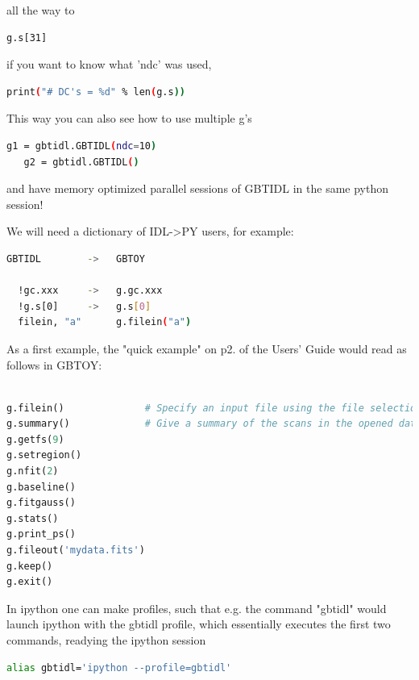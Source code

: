 \documentclass[12pt,a4paper]{article}
\begin{document}
all the way to

\begin{lstlisting}[language=bash]
   g.s[31]
\end{lstlisting}

if you want to know what 'ndc' was used,

\begin{lstlisting}[language=bash]
   print("# DC's = %d" % len(g.s))
\end{lstlisting}

This way you can also see how to use multiple g's

\begin{lstlisting}[language=bash]
   g1 = gbtidl.GBTIDL(ndc=10)
   g2 = gbtidl.GBTIDL()
\end{lstlisting}

and have memory optimized parallel sessions of GBTIDL in the same
python session!

We will need a dictionary of IDL->PY users, for example:

\begin{lstlisting}[language=bash]
GBTIDL        ->   GBTOY

  !gc.xxx     ->   g.gc.xxx
  !g.s[0]     ->   g.s[0]
  filein, "a"      g.filein("a")
\end{lstlisting}

As a first example, the "quick example" on p2. of the Users' Guide would
read as follows in GBTOY:

\begin{lstlisting}[language=python]
% gbtidl                # start up an ipython session with the gbtidl profile

g.filein()              # Specify an input file using the file selection GUI
g.summary()             # Give a summary of the scans in the opened data file
g.getfs(9)
g.setregion()
g.nfit(2)
g.baseline()
g.fitgauss()
g.stats()
g.print_ps()
g.fileout('mydata.fits')
g.keep()
g.exit()

\end{lstlisting}


In ipython one can make profiles, such that e.g. the command "gbtidl" would launch ipython with
the gbtidl profile, which essentially executes the first two commands, readying the ipython
session 

\begin{lstlisting}[language=bash]
    alias gbtidl='ipython --profile=gbtidl'
\end{lstlisting}
\end{document}
